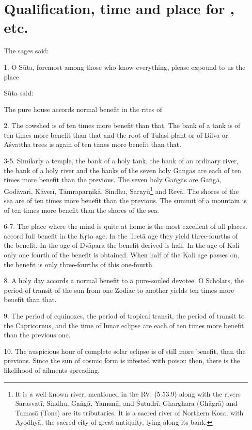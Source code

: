 \chapter{Qualification, time and place for , etc.}

The sages said:

1. O Sūta, foremost among those who know everything, please expound to us
the place \etc

Sūta said:

The pure house accords normal benefit in the rites of  \etc

2. The cowshed is of ten times more benefit than that. The bank of a tank is of
ten times more benefit than that and the root of Tulasi plant or of Bilva or
Aśvattha trees is again of ten times more benefit than that.

3-5. Similarly a temple, the bank of a holy tank, the bank of an ordinary river,
the bank of a holy river and the banks of the seven holy Gaṅgās are each of ten
times more benefit than the previous. The seven holy Gaṅgās are Gaṅgā, Godāvarī,
Kāverī, Tāmraparṇikā, Sindhu, Sarayū\footnote{It is a well known river,
mentioned in the RV. (5.53.9) along with the rivers Sarasvatī, Sindhu, Gaṅgā,
Yamunā, and Śutudrī. Gharghara (Ghāgrā) and Tamasā (Tons) are its tributaries.
It is a sacred river of Northern Kosa, with Ayodhyā, the sacred city of great
antiquity, lying along its bank.} and Revā. The shores of the sea are of ten
times more benefit than the previous. The summit of a mountain is of ten times
more benefit than the shores of the sea.

6-7. The place where the mind is quite at home is the most excellent of all
places.  \etc accord full benefit in the Kṛta age. In the Tretā
age they yield three-fourths of the benefit. In the age of Dvāpara the benefit
derived is half. In the age of Kali only one fourth of the benefit is obtained.
When half of the Kali age passes on, the benefit is only three-fourths of this
one-fourth.

8. A holy day accords a normal benefit to a pure-souled devotee. O Scholars,
the period of transit of the sun from one Zodiac to another yields ten times
more benefit than that.

9. The period of equinoxes, the period of tropical transit, the period of
transit to the Capricornus, and the time of lunar eclipse are each of ten times
more benefit than the previous one.

10. The auspicious hour of complete solar eclipse is of still more benefit, than
the previous. Since the sun of cosmic form is infested with poison then, there
is the likelihood of ailments spreading.

